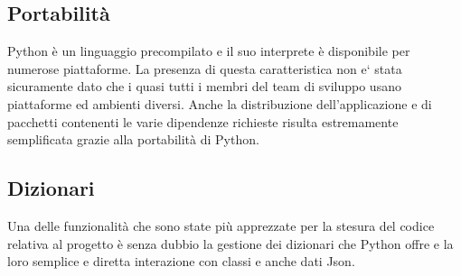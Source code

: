 \documentclass[12pt]{scrartcl}
\begin{document}
\subsection{Portabilit\`a}
Python \`e un linguaggio precompilato e il suo interprete \`e disponibile per
numerose piattaforme. La presenza di questa caratteristica non e` stata sicuramente
dato che i quasi tutti i membri del team di sviluppo usano piattaforme ed ambienti
diversi. Anche la distribuzione dell'applicazione e di pacchetti contenenti le 
varie dipendenze richieste risulta estremamente semplificata grazie alla portabilit\`a di Python.


\subsection{Dizionari}
Una delle funzionalit\`a che sono state pi\`u apprezzate per la stesura del codice
relativa al progetto \`e senza dubbio la gestione dei dizionari che Python offre
e la loro semplice e diretta interazione con classi e anche dati Json.



\begin{thebibliography}{10}	


\end{thebibliography}
\end{document}
